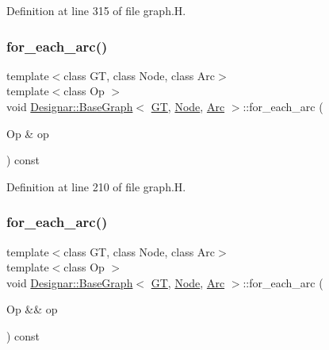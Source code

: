 Definition at line 315 of file graph.\+H.

\mbox{\label{class_designar_1_1_base_graph_ac46a1a7517a6c7029c6bae23d480cfa9}} 
\subsubsection{\texorpdfstring{for\+\_\+each\+\_\+arc()}{for\_each\_arc()}\hspace{0.1cm}{\footnotesize\ttfamily [1/2]}}
{\footnotesize\ttfamily template$<$class GT, class Node, class Arc$>$ \\
template$<$class Op $>$ \\
void \hyperlink{class_designar_1_1_base_graph}{Designar\+::\+Base\+Graph}$<$ \hyperlink{demo-buildgraph_8_c_a3001c40d2c31ca87ed96cd7d1334a55e}{GT}, \hyperlink{namespace_designar_a5af326c65aa2bd26b26c410f2030d09e}{Node}, \hyperlink{namespace_designar_a3f55fb5513d62ff47cbc8f72b8e95d6f}{Arc} $>$\+::for\+\_\+each\+\_\+arc (\begin{DoxyParamCaption}\item[{Op \&}]{op }\end{DoxyParamCaption}) const\hspace{0.3cm}{\ttfamily [inline]}}



Definition at line 210 of file graph.\+H.

\mbox{\label{class_designar_1_1_base_graph_ae76905d5baebd62d0fc481efc7c20f66}} 
\subsubsection{\texorpdfstring{for\+\_\+each\+\_\+arc()}{for\_each\_arc()}\hspace{0.1cm}{\footnotesize\ttfamily [2/2]}}
{\footnotesize\ttfamily template$<$class GT, class Node, class Arc$>$ \\
template$<$class Op $>$ \\
void \hyperlink{class_designar_1_1_base_graph}{Designar\+::\+Base\+Graph}$<$ \hyperlink{demo-buildgraph_8_c_a3001c40d2c31ca87ed96cd7d1334a55e}{GT}, \hyperlink{namespace_designar_a5af326c65aa2bd26b26c410f2030d09e}{Node}, \hyperlink{namespace_designar_a3f55fb5513d62ff47cbc8f72b8e95d6f}{Arc} $>$\+::for\+\_\+each\+\_\+arc (\begin{DoxyParamCaption}\item[{Op \&\&}]{op }\end{DoxyParamCaption}) const\hspace{0.3cm}{\ttfamily [inline]}}



